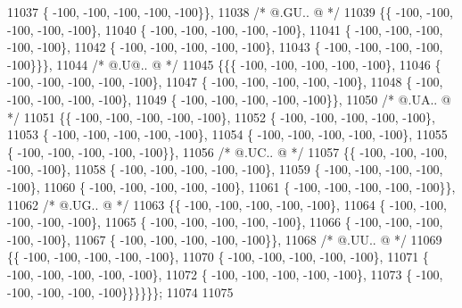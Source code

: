 \begin{DoxyCode}
11037 \{ -100, -100, -100, -100, -100\}\},
11038 \textcolor{comment}{/*  @.GU.. @ */}
11039 \{\{ -100, -100, -100, -100, -100\},
11040 \{ -100, -100, -100, -100, -100\},
11041 \{ -100, -100, -100, -100, -100\},
11042 \{ -100, -100, -100, -100, -100\},
11043 \{ -100, -100, -100, -100, -100\}\}\},
11044 \textcolor{comment}{/*  @.U@.. @ */}
11045 \{\{\{ -100, -100, -100, -100, -100\},
11046 \{ -100, -100, -100, -100, -100\},
11047 \{ -100, -100, -100, -100, -100\},
11048 \{ -100, -100, -100, -100, -100\},
11049 \{ -100, -100, -100, -100, -100\}\},
11050 \textcolor{comment}{/*  @.UA.. @ */}
11051 \{\{ -100, -100, -100, -100, -100\},
11052 \{ -100, -100, -100, -100, -100\},
11053 \{ -100, -100, -100, -100, -100\},
11054 \{ -100, -100, -100, -100, -100\},
11055 \{ -100, -100, -100, -100, -100\}\},
11056 \textcolor{comment}{/*  @.UC.. @ */}
11057 \{\{ -100, -100, -100, -100, -100\},
11058 \{ -100, -100, -100, -100, -100\},
11059 \{ -100, -100, -100, -100, -100\},
11060 \{ -100, -100, -100, -100, -100\},
11061 \{ -100, -100, -100, -100, -100\}\},
11062 \textcolor{comment}{/*  @.UG.. @ */}
11063 \{\{ -100, -100, -100, -100, -100\},
11064 \{ -100, -100, -100, -100, -100\},
11065 \{ -100, -100, -100, -100, -100\},
11066 \{ -100, -100, -100, -100, -100\},
11067 \{ -100, -100, -100, -100, -100\}\},
11068 \textcolor{comment}{/*  @.UU.. @ */}
11069 \{\{ -100, -100, -100, -100, -100\},
11070 \{ -100, -100, -100, -100, -100\},
11071 \{ -100, -100, -100, -100, -100\},
11072 \{ -100, -100, -100, -100, -100\},
11073 \{ -100, -100, -100, -100, -100\}\}\}\}\}\};
11074 
11075 
\end{DoxyCode}
